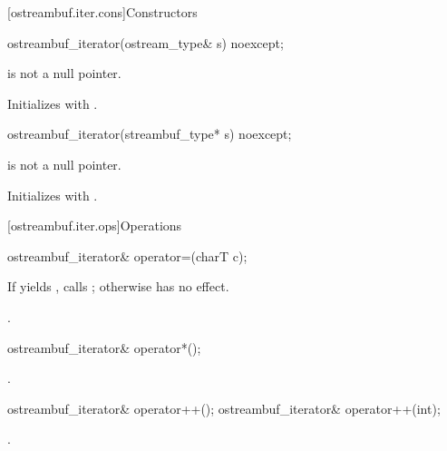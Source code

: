 [ostreambuf.iter.cons]{Constructors}

%
\begin{itemdecl}
ostreambuf_iterator(ostream_type& s) noexcept;
\end{itemdecl}

\begin{itemdescr}
\pnum
\expects
{}
is not a null pointer.

\pnum
\effects
Initializes  with .
\end{itemdescr}


%
\begin{itemdecl}
ostreambuf_iterator(streambuf_type* s) noexcept;
\end{itemdecl}

\begin{itemdescr}
\pnum
\expects
{}
is not a null pointer.

\pnum
\effects
Initializes  with .
\end{itemdescr}

[ostreambuf.iter.ops]{Operations}

%
\begin{itemdecl}
ostreambuf_iterator& operator=(charT c);
\end{itemdecl}

\begin{itemdescr}
\pnum
\effects
If
yields
,
calls
;
otherwise has no effect.

\pnum
\returns
{}.
\end{itemdescr}

%
\begin{itemdecl}
ostreambuf_iterator& operator*();
\end{itemdecl}

\begin{itemdescr}
\pnum
\returns
{}.
\end{itemdescr}

%
\begin{itemdecl}
ostreambuf_iterator& operator++();
ostreambuf_iterator& operator++(int);
\end{itemdecl}

\begin{itemdescr}
\pnum
\returns
{}.
\end{itemdescr}


